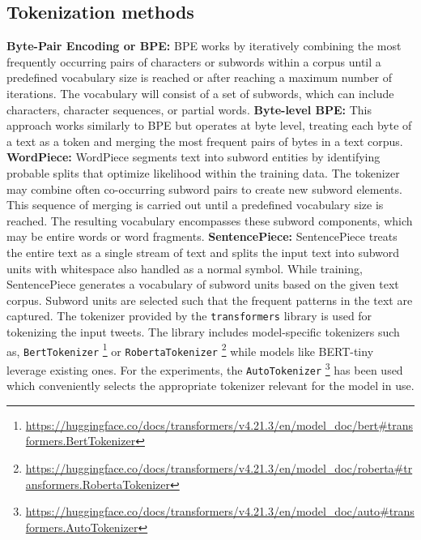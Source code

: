 \subsection{Tokenization methods}
\textbf{Byte-Pair Encoding or BPE:} BPE works by iteratively combining the most frequently occurring pairs of characters or subwords within a corpus until a predefined vocabulary size is reached or after reaching a maximum number of iterations. The vocabulary will consist of a set of subwords, which can include characters, character sequences, or partial words. \newline\newline
\textbf{Byte-level BPE:} This approach works similarly to BPE but operates at byte level, treating each byte of a text as a token and merging the most frequent pairs of bytes in a text corpus. \newline\newline
\textbf{WordPiece:} WordPiece segments text into subword entities by identifying probable splits that optimize likelihood within the training data. The tokenizer may combine often co-occurring subword pairs to create new subword elements. This sequence of merging is carried out until a predefined vocabulary size is reached. The resulting vocabulary encompasses these subword components, which may be entire words or word fragments. \newline\newline
\textbf{SentencePiece:} SentencePiece treats the entire text as a single stream of text and splits the input text into subword units with whitespace also handled as a normal symbol. While training, SentencePiece generates a vocabulary of subword units based on the given text corpus. Subword units are selected such that the frequent patterns in the text are captured.
\newline\newline
The tokenizer provided by the \texttt{transformers} library is used for tokenizing the input tweets. The library includes model-specific tokenizers such as, \texttt{BertTokenizer} \footnote{\url{https://huggingface.co/docs/transformers/v4.21.3/en/model_doc/bert#transformers.BertTokenizer}} or \texttt{RobertaTokenizer} \footnote{\url{https://huggingface.co/docs/transformers/v4.21.3/en/model_doc/roberta#transformers.RobertaTokenizer}} while models like BERT-tiny leverage existing ones. For the experiments, the \texttt{AutoTokenizer} \footnote{\url{https://huggingface.co/docs/transformers/v4.21.3/en/model_doc/auto#transformers.AutoTokenizer}} has been used which conveniently selects the appropriate tokenizer relevant for the model in use.


